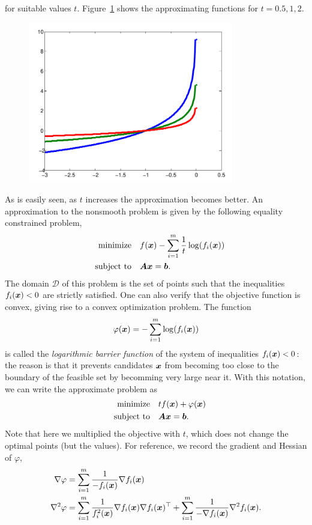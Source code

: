 for suitable values $t$. Figure~\ref{fig:1} shows the approximating functions for $t=0.5,1,2$. 
\begin{figure}[h!]
 \centering
 \includegraphics[width=0.8\textwidth]{images/logbarrier_cropped.pdf}
 \label{fig:1}
\end{figure}
As is easily seen, as $t$ increases the approximation becomes better.
An approximation to the nonsmooth problem is given by the following equality constrained problem,
\begin{align*}
\begin{split}
\text{minimize}\quad & f(\bm{x})-\sum_{i=1}^{m} \frac{1}{t}\log(f_i(\bm{x}))\\
\quad\text{subject to}\quad & \bm{A}\bm{x}=\bm{b}.
\end{split}
\end{align*}
The domain $\mathcal{D}$ of this problem is the set of points such that the inequalities $f_i(\bm{x})<0$ are strictly satisfied. One can also verify that the objective function is convex, giving rise to a convex optimization problem.
The function
\begin{equation*}
 \varphi(\bm{x}) = -\sum_{i=1}^m \log(f_i(\bm{x}))
\end{equation*}
is called the {\em logarithmic barrier function} of the system of inequalities $f_i(\bm{x})<0$: the reason is that it prevents candidates $\bm{x}$ from becoming too close to the boundary of the feasible set by becomming very large near it. With this notation, we can write the approximate problem as
\begin{align}\label{eq:logbarrier}
\begin{split}
\text{minimize}\quad & tf(\bm{x})+\varphi(\bm{x})\\
\quad\text{subject to}\quad & \bm{A}\bm{x}=\bm{b}.
\end{split}
\end{align}
Note that here we multiplied the objective with $t$, which does not change the optimal points (but the values).
For reference, we record the gradient and Hessian of $\varphi$,
\begin{align*}
 \nabla \varphi &= \sum_{i=1}^m \frac{1}{-f_i(\bm{x})}\nabla f_i(\bm{x})\\
 \nabla^2\varphi &= \sum_{i=1}^m \frac{1}{f_i^2(\bm{x})}\nabla f_i(\bm{x})\nabla f_i(\bm{x})^{\top}+\sum_{i=1}^m \frac{1}{-\nabla f_i(\bm{x})}\nabla^2 f_i(\bm{x}).
\end{align*}

